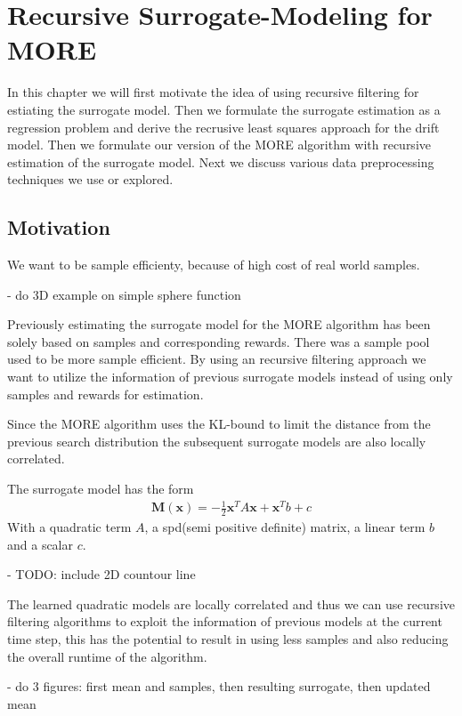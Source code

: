 
\chapter{Recursive Surrogate-Modeling for MORE}
In this chapter we will first motivate the idea of using recursive filtering
for estiating the surrogate model. Then we formulate the surrogate estimation
as a regression problem and derive the recrusive
least squares approach for the drift model.
Then we formulate our version of the MORE algorithm with
recursive estimation of the surrogate model.
Next we discuss various data preprocessing techniques we use or explored.

\section{Motivation}
We want to be sample efficienty, because of high cost of real world samples.

- do 3D example on simple sphere function

Previously estimating the surrogate model for the MORE algorithm has been solely based
on samples and corresponding rewards. There was a sample pool used to be more
sample efficient. By using an recursive filtering approach
we want to utilize the information of previous surrogate models instead
of using only samples and rewards for estimation.

Since the MORE algorithm uses the KL-bound to limit the distance from the previous search
distribution the subsequent surrogate models are also locally correlated.

The surrogate model has the form
\begin{align}
  \label{surrogate}
  \mathbf{M}(\mathbf{x}) = -\frac{1}{2} \mathbf{x}^T A \mathbf{x}
  + \mathbf{x}^T b + c 
\end{align}
With a quadratic term $A$, a spd(semi positive definite) matrix, a
linear term $b$ and a scalar $c$.

- TODO: include 2D countour line

The learned quadratic models are locally correlated and thus we can use recursive
filtering algorithms to exploit the information of previous models at
the current time step, this has the potential to result in using less samples
and also reducing the overall runtime of the algorithm.

- do 3 figures: first mean and samples, then resulting surrogate, then updated mean

